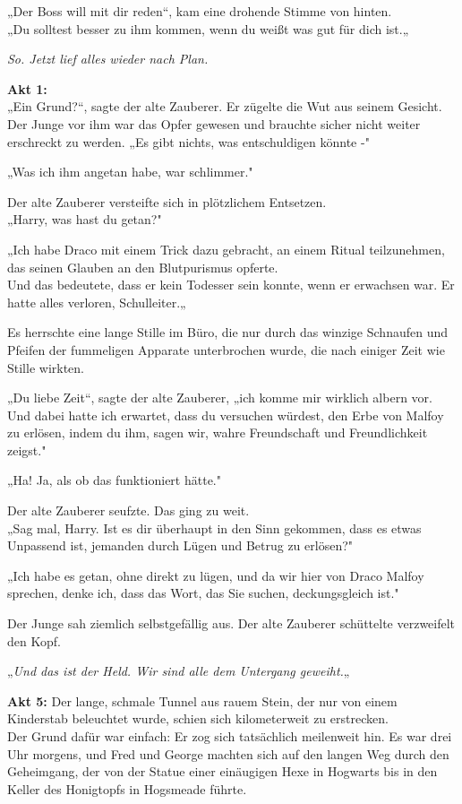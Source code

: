 {„Der Boss will mit dir reden“, kam eine drohende Stimme von hinten.\\ „Du solltest besser zu ihm kommen, wenn du weißt was gut für dich ist.„

\emph{So. Jetzt lief alles wieder nach Plan.}

\textbf{Akt 1:}\\ „Ein Grund?“, sagte der alte Zauberer. Er zügelte die Wut aus seinem Gesicht.\\ Der Junge vor ihm war das Opfer gewesen und brauchte sicher nicht weiter erschreckt zu werden. „Es gibt nichts, was entschuldigen könnte -"

„Was ich ihm angetan habe, war schlimmer."

Der alte Zauberer versteifte sich in plötzlichem Entsetzen.\\ „Harry, was hast du getan?"

„Ich habe Draco mit einem Trick dazu gebracht, an einem Ritual teilzunehmen, das seinen Glauben an den Blutpurismus opferte.\\ Und das bedeutete, dass er kein Todesser sein konnte, wenn er erwachsen war. Er hatte alles verloren, Schulleiter.„

Es herrschte eine lange Stille im Büro, die nur durch das winzige Schnaufen und Pfeifen der fummeligen Apparate unterbrochen wurde, die nach einiger Zeit wie Stille wirkten.

„Du liebe Zeit“, sagte der alte Zauberer, „ich komme mir wirklich albern vor. Und dabei hatte ich erwartet, dass du versuchen würdest, den Erbe von Malfoy zu erlösen, indem du ihm, sagen wir, wahre Freundschaft und Freundlichkeit zeigst."

„Ha! Ja, als ob das funktioniert hätte."

Der alte Zauberer seufzte. Das ging zu weit.\\ „Sag mal, Harry. Ist es dir überhaupt in den Sinn gekommen, dass es etwas Unpassend ist, jemanden durch Lügen und Betrug zu erlösen?"

„Ich habe es getan, ohne direkt zu lügen, und da wir hier von Draco Malfoy sprechen, denke ich, dass das Wort, das Sie suchen, deckungsgleich ist."

Der Junge sah ziemlich selbstgefällig aus. Der alte Zauberer schüttelte verzweifelt den Kopf.

„\emph{Und das ist der Held. Wir sind alle dem Untergang geweiht.}„

\textbf{Akt 5:} Der lange, schmale Tunnel aus rauem Stein, der nur von einem Kinderstab beleuchtet wurde, schien sich kilometerweit zu erstrecken.\\ Der Grund dafür war einfach: Er zog sich tatsächlich meilenweit hin. Es war drei Uhr morgens, und Fred und George machten sich auf den langen Weg durch den Geheimgang, der von der Statue einer einäugigen Hexe in Hogwarts bis in den Keller des Honigtopfs in Hogsmeade führte.

}
